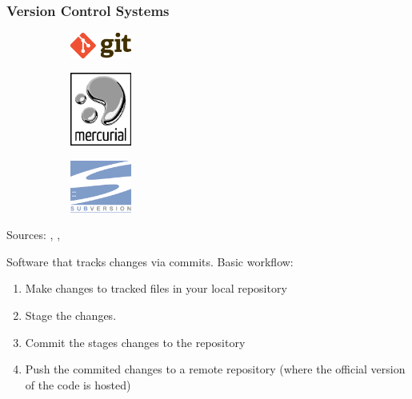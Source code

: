 \begin{frame}
    \frametitle{Version Control Systems}
    \begin{figure}[htpb]
        \begin{subfigure}
        \centering
            \includegraphics[width=2cm]{images/git-logo.eps}
        \end{subfigure}
        \hspace{1cm}
        \begin{subfigure}
        \centering
            \includegraphics[width=2cm]{images/mercurial-logo.eps}
        \end{subfigure}
        \hspace{1cm}
        \begin{subfigure}
        \centering
            \includegraphics[width=2cm]{images/subversion-logo.eps}
        \end{subfigure}
    \end{figure}
    \begin{center}
        {\tiny Sources: \cite{git_logo}, \cite{mercurial_logo}, \cite{subversion_logo}}
    \end{center}

    Software that tracks changes via commits.
\newline
\newline
    \newline
    \newline
    Basic workflow:
    \begin{enumerate}
        \item Make changes to tracked files in your local repository
        \item Stage the changes.
        \item Commit the stages changes to the repository
        \item Push the commited changes to a remote repository (where the official version of the code is hosted)
    \end{enumerate}
\end{frame}

